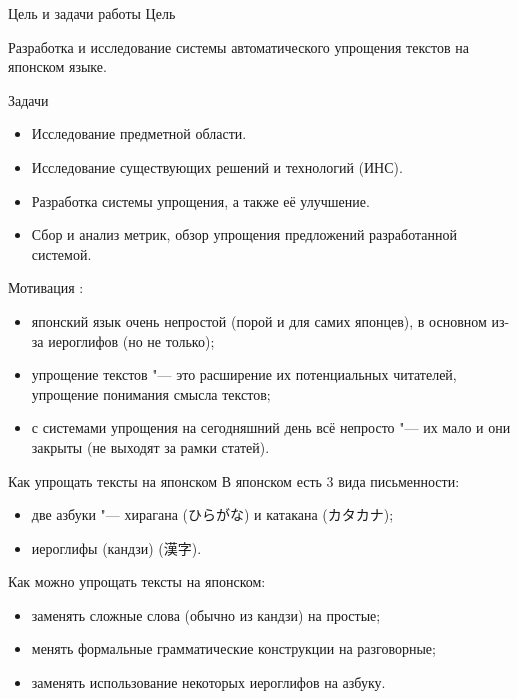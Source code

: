 \begin{frame}[fragile]{Цель и задачи работы}%
  \Large
  Цель
  \normalsize

  Разработка и исследование системы автоматического упрощения текстов на японском языке.

  \Large
  Задачи
  \normalsize

  \begin{itemize}%
    \item Исследование предметной области.
    \item Исследование существующих решений и технологий (ИНС).
    \item Разработка системы упрощения, а также её улучшение.
    \item Сбор и анализ метрик, обзор упрощения предложений разработанной системой.
  \end{itemize}
\end{frame}


\begin{frame}[fragile]{Мотивация}%
  :
  \begin{itemize}%
    \item японский язык очень непростой (порой и для самих японцев), в основном из-за иероглифов (но не только);
    \item упрощение текстов "--- это расширение их потенциальных читателей, упрощение понимания смысла текстов;
    \item с системами упрощения на сегодняшний день всё непросто "--- их мало и они закрыты (не выходят за рамки статей).
  \end{itemize}
\end{frame}


\begin{frame}[fragile]{Как упрощать тексты на японском}%
  В японском есть 3 вида письменности:
  \begin{itemize}%
    \item две азбуки "--- хирагана (ひらがな) и катакана (カタカナ);
    \item иероглифы (кандзи) (漢字).
  \end{itemize}

  Как можно упрощать тексты на японском:
  \begin{itemize}%
    \item заменять сложные слова (обычно из кандзи) на простые;
    \item менять формальные грамматические конструкции на разговорные;
    \item заменять использование некоторых иероглифов на азбуку.
  \end{itemize}
\end{frame}

